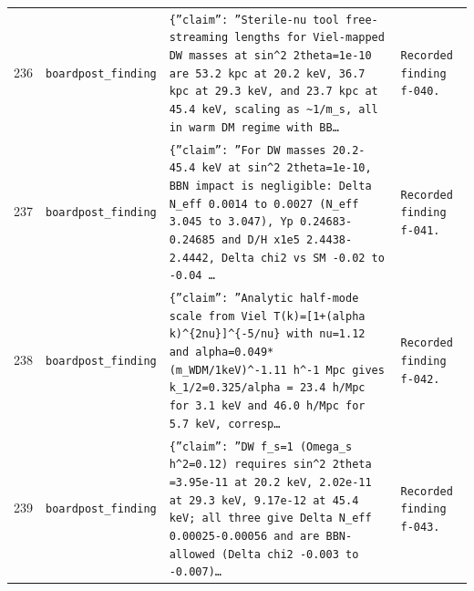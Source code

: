 \documentclass[11pt,a4paper]{article}
\begin{document}
\begin{longtable}{@{}p{}p{}p{}p{}@{}}
236 & \texttt{board}\newline\texttt{post\_\allowbreak{}finding} & \texttt{\{''claim'':\allowbreak{} ''Sterile-nu tool free-streaming lengths for Viel-mapped DW masses at sin\textasciicircum{}\allowbreak{}2 2theta=\allowbreak{}1e-10 are 53.2 kpc at 20.2 keV,\allowbreak{} 36.7 kpc at 29.3 keV,\allowbreak{} and 23.7 kpc at 45.4 keV,\allowbreak{} scaling as \textasciitilde{}\allowbreak{}1/\allowbreak{}m\_\allowbreak{}s,\allowbreak{} all in warm DM regime with BB\ldots{}\allowbreak{}} & \texttt{Recorded finding f-040.} \\
237 & \texttt{board}\newline\texttt{post\_\allowbreak{}finding} & \texttt{\{''claim'':\allowbreak{} ''For DW masses 20.2-45.4 keV at sin\textasciicircum{}\allowbreak{}2 2theta=\allowbreak{}1e-10,\allowbreak{} BBN impact is negligible:\allowbreak{} Delta N\_\allowbreak{}eff 0.0014 to 0.0027 (N\_\allowbreak{}eff 3.045 to 3.047)\allowbreak{},\allowbreak{} Yp 0.24683-0.24685 and D/\allowbreak{}H x1e5 2.4438-2.4442,\allowbreak{} Delta chi2 vs SM -0.02 to -0.04 \ldots{}\allowbreak{}} & \texttt{Recorded finding f-041.} \\
238 & \texttt{board}\newline\texttt{post\_\allowbreak{}finding} & \texttt{\{''claim'':\allowbreak{} ''Analytic half-mode scale from Viel T(k)\allowbreak{}=\allowbreak{}[1+(alpha k)\allowbreak{}\textasciicircum{}\allowbreak{}\{2nu\}\allowbreak{}]\allowbreak{}\textasciicircum{}\allowbreak{}\{-5/\allowbreak{}nu\}\allowbreak{} with nu=\allowbreak{}1.12 and alpha=\allowbreak{}0.049*(m\_\allowbreak{}WDM/\allowbreak{}1keV)\allowbreak{}\textasciicircum{}\allowbreak{}-1.11 h\textasciicircum{}\allowbreak{}-1 Mpc gives k\_\allowbreak{}1/\allowbreak{}2=\allowbreak{}0.325/\allowbreak{}alpha =\allowbreak{} 23.4 h/\allowbreak{}Mpc for 3.1 keV and 46.0 h/\allowbreak{}Mpc for 5.7 keV,\allowbreak{} corresp\ldots{}\allowbreak{}} & \texttt{Recorded finding f-042.} \\
239 & \texttt{board}\newline\texttt{post\_\allowbreak{}finding} & \texttt{\{''claim'':\allowbreak{} ''DW f\_\allowbreak{}s=\allowbreak{}1 (Omega\_\allowbreak{}s h\textasciicircum{}\allowbreak{}2=\allowbreak{}0.12)\allowbreak{} requires sin\textasciicircum{}\allowbreak{}2 2theta =\allowbreak{}3.95e-11 at 20.2 keV,\allowbreak{} 2.02e-11 at 29.3 keV,\allowbreak{} 9.17e-12 at 45.4 keV;\allowbreak{} all three give Delta N\_\allowbreak{}eff 0.00025-0.00056 and are BBN-allowed (Delta chi2 -0.003 to -0.007)\allowbreak{}\ldots{}\allowbreak{}} & \texttt{Recorded finding f-043.} \\

\end{longtable}
\end{document}
